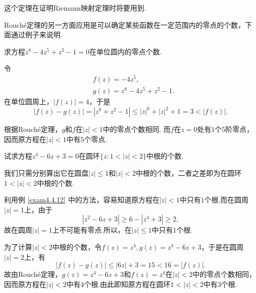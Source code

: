 这个定理在证明Riemann映射定理时将要用到.

Rouch\'e定理的另一方面应用是可以确定某些函数在一定范围内的零点的个数，下面通过例子来说明.
\begin{example}\label{exam4.4.12}
求方程$z^8-4z^5+z^2-1=0$在单位圆内的零点个数.
\end{example}
\begin{solution}
令
\begin{align*}
&f(z)=-4z^5,\\
&g(z)=z^8-4z^5+z^2-1.
\end{align*}
在单位圆周上，$|f(z)|=4$，于是
\[
|f(z)-g(z)|=|z^8+z^2-1|\le|z|^8+|z|^2+1=3<|f(z)|.
\]
\end{solution}
根据Rouch\'e定理，$g$和$f$在$|z|<1$中的零点个数相同. 而$f$在$z=0$处有$1$个$5$阶零点，因而原方程在$|z|<1$中有$5$个零点.

\begin{example}\label{exam4.4.13}
试求方程$z^4-6z+3=0$在圆环$\{z:1<|z|<2\}$中根的个数.
\end{example}
\begin{solution}
我们只需分别算出它在圆盘$|z|\le1$和$|z|<2$中根的个数，二者之差即为在圆环$1<|z|<2$中根的个数.

利用例 \ref{exam4.4.12} 中的方法，容易知道原方程在$|z|<1$中只有$1$个根.而在圆周$|z|=1$上，由于
\[|z^2-6z+3|\ge 6-|z^4+3|\ge2,\]
故在圆周$|z|=1$上不可能有零点.所以，在$|z|\le1$中只有$1$个根.

为了计算$|z|<2$中根的个数，令$f(z)=z^4,g(z)=z^4-6z+3$，于是在圆周$|z|=2$上，有
\[|f(z)-g(z)|\le|6z|+3=15<16=|f(z)|.\]
故由Rouch\'e定理，$g(z)=z^4-6z+3$和$f(z)=z^4$在$|z|<2$中的零点个数相同，因而原方程在$|z|<2$中有$4$个根.由此即知原方程在圆环$1<|z|<2$中有$3$个根.
\end{solution}


